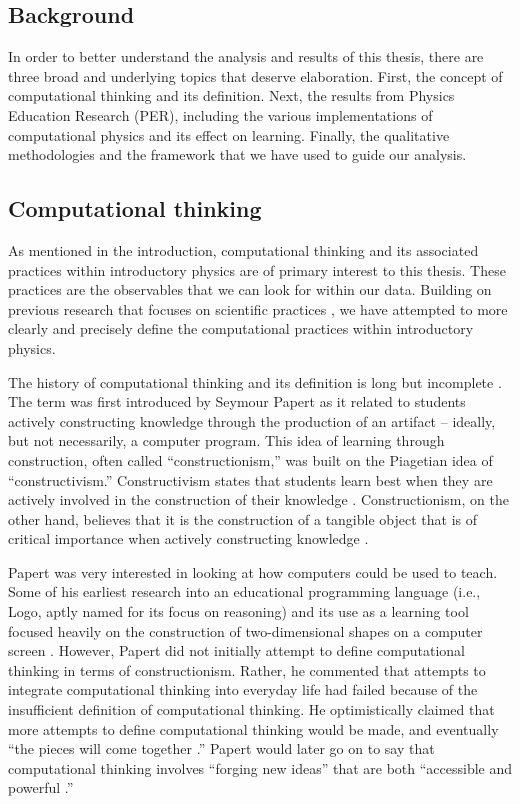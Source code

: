 \documentclass{msuphddissertation}
\begin{document}
\begin{doublespace}

\chapter{Background}\label{CH2:Background}

In order to better understand the analysis and results of this thesis, there are three broad and underlying topics that deserve elaboration.  First, the concept of computational thinking and its definition.  Next, the results from Physics Education Research (PER), including the various implementations of computational physics and its effect on learning.  Finally, the qualitative methodologies and the framework that we have used to guide our analysis.

\section{Computational thinking}

As mentioned in the introduction, computational thinking and its associated practices within introductory physics are of primary interest to this thesis.  These practices are the observables that we can look for within our data.  Building on previous research that focuses on scientific practices \cite{AAPT2016,NGSS2012,Weintrop2015}, we have attempted to more clearly and precisely define the computational practices within introductory physics.

The history of computational thinking and its definition is long but incomplete \cite{Papert1981,Papert1996,Wing2006,Wing2008,Aho2012,Grover2013,Bundy2007}.  The term was first introduced by Seymour Papert as it related to students actively constructing knowledge through the production of an artifact -- ideally, but not necessarily, a computer program.  This idea of learning through construction, often called ``constructionism,'' was built on the Piagetian idea of ``constructivism.''  Constructivism states that students learn best when they are actively involved in the construction of their knowledge \cite{Piaget1963}.  Constructionism, on the other hand, believes that it is the construction of a tangible object that is of critical importance when actively constructing knowledge \cite{Papert1981}.

Papert was very interested in looking at how computers could be used to teach.  Some of his earliest research into an educational programming language (i.e., Logo, aptly named for its focus on reasoning) and its use as a learning tool focused heavily on the construction of two-dimensional shapes on a computer screen \cite{Papert1972}.  However, Papert did not initially attempt to define computational thinking in terms of constructionism.  Rather, he commented that attempts to integrate computational thinking into everyday life had failed because of the insufficient definition of computational thinking.  He optimistically claimed that more attempts to define computational thinking would be made, and eventually ``the pieces will come together \cite{Papert1981}.''  Papert would later go on to say that computational thinking involves ``forging new ideas'' that are both ``accessible and powerful \cite{Papert1996}.''


\end{doublespace}
\end{document}
